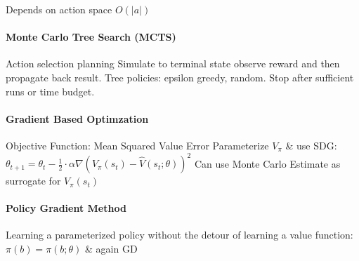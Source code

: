 \documentclass[a4paper, 10pt]{scrartcl}
\begin{document}
\begin{multicols*}{3}
Depends on action space $O(|a|)$

\paragraph{Monte Carlo Tree Search (MCTS)}
Action selection planning
Simulate to terminal state observe reward and then propagate back result. Tree policies: epsilon greedy, random. Stop after sufficient runs or time budget.

\paragraph{Gradient Based Optimzation}
Objective Function: Mean Squared Value Error
Parameterize $V_\pi$ \& use SDG:
$\theta_{t+1} = \theta_{t} - \frac{1}{2}\cdot\alpha\nabla(V_\pi(s_t) - \hat{V}(s_t; \theta ))^2$
Can use Monte Carlo Estimate as surrogate for $V_\pi(s_t)$

\paragraph{Policy Gradient Method}
Learning a parameterized policy without the detour of learning a value function: $\pi(b) = \pi(b;\theta)$ \& again GD

\end{multicols*}
\end{document}
